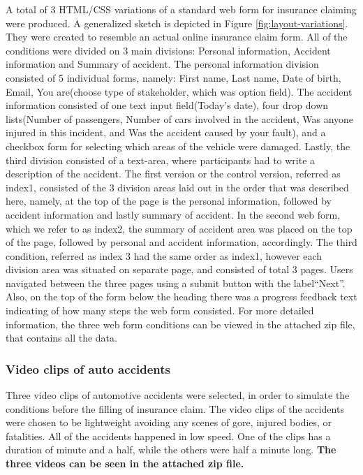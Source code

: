 \documentclass[../main/Feedback.tex]{subfiles}
\begin{document}
A total of 3 HTML/CSS variations of a standard web form for insurance claiming were produced. A generalized sketch is depicted in Figure \ref{fig:layout-variations}. They were created to resemble an actual online insurance claim form. All of the conditions were divided on 3 main divisions: Personal information, Accident information and Summary of accident. The personal information division consisted of 5 individual forms, namely: First name, Last name, Date of birth, Email, You are(choose type of stakeholder, which was option field). The accident information consisted of one text input field(Today's date), four drop down lists(Number of passengers, Number of cars involved in the accident, Was anyone injured in this incident, and Was the accident caused by your fault), and a checkbox form for selecting which areas of the vehicle were damaged. Lastly, the third division consisted of a text-area, where participants had to write a description of the accident. The first version or the control version, referred as index1, consisted of the 3 division areas laid out in the order that was described here, namely, at the top of the page is the personal information, followed by accident information and lastly summary of accident. In the second web form, which we refer to as index2, the summary of accident area was placed on the top of the page, followed by personal and accident information, accordingly. The third condition, referred as index 3 had the same order as index1, however each division area was situated on separate page, and consisted of total 3 pages. Users navigated between the three pages using a submit button with the label``Next''. Also, on the top of the form below the heading there was a progress feedback text indicating of how many steps the web form consisted. For more detailed information, the three web form conditions can be viewed in the attached zip file, that contains all the data.
\subsubsection{Video clips of auto accidents}
Three video clips of automotive accidents were selected, in order to simulate the conditions before the filling of insurance claim. The video clips of the accidents were chosen to be lightweight avoiding any scenes of gore, injured bodies, or fatalities. All of the accidents happened in low speed. One of the clips has a duration of minute and a half, while the others were half a minute long. \textbf{The three videos can be seen in the attached zip file.}
\end{document}
